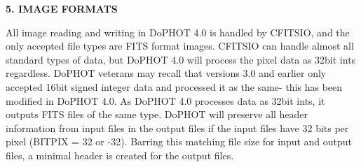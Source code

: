 \centerline{\bf 5.  IMAGE FORMATS}

All image reading and writing in DoPHOT 4.0 is handled 
by CFITSIO, and the only accepted file types are FITS format images.  
CFITSIO can handle almost all standard types of data, but DoPHOT 
4.0 will process the pixel data as 32bit ints regardless.  DoPHOT 
veterans may recall that versions 3.0 and earlier only accepted 16bit 
signed integer data and processed it as the same- this has been 
modified in DoPHOT 4.0.  As DoPHOT 4.0 processes data as 32bit 
ints, it outputs FITS files of the same type.  DoPHOT will preserve all
header information from input files in the output files if the input
files have 32 bits per pixel (BITPIX = 32 or -32).  Barring this matching
file size for input and output files, a minimal header is created for the 
output files.

